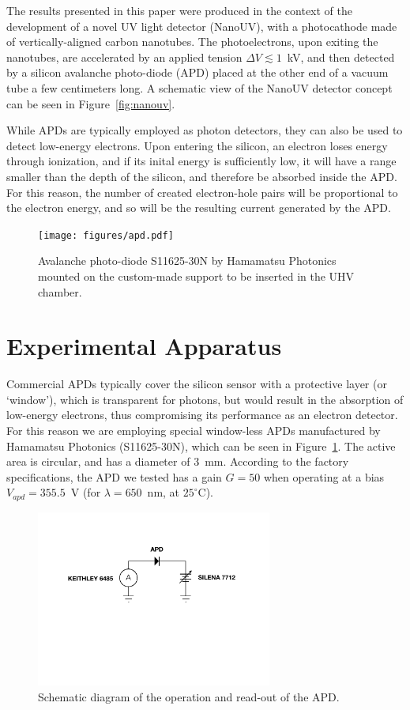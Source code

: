 \documentclass[12p]{paper}
\begin{document}
The results presented in this paper were produced in the context of the development of a novel UV light detector (NanoUV), with a photocathode made of vertically-aligned carbon nanotubes. The photoelectrons, upon exiting the nanotubes, are accelerated by an applied tension $\Delta V \lesssim 1$~kV, and then detected by a silicon avalanche photo-diode (APD) placed at the other end of a vacuum tube a few centimeters long. A schematic view of the NanoUV detector concept can be seen in Figure~\ref{fig:nanouv}. 

While APDs are typically employed as photon detectors, they can also be used to detect low-energy electrons. 
Upon entering the silicon, an electron loses energy through ionization, and if its inital energy is sufficiently low, it will have a range smaller than the depth of the silicon, and therefore be absorbed inside the APD. For this reason, the number of created electron-hole pairs will be proportional to the electron energy, and so will be the resulting current generated by the APD.

\begin{figure}[htb]
  \centering
  \texttt{[image: figures/apd.pdf]}
 \caption{Avalanche photo-diode S11625-30N by Hamamatsu Photonics mounted on the custom-made support to be inserted in the UHV chamber.
  \label{fig:apd}}
\end{figure}


\section{Experimental Apparatus}

Commercial APDs typically cover the silicon sensor with a protective layer (or `window'), which is transparent for photons, but would result in the absorption of low-energy electrons, thus compromising its performance as an electron detector. For this reason we are employing special window-less APDs manufactured by Hamamatsu Photonics (S11625-30N), which can be seen in Figure~\ref{fig:apd}. The active area is circular, and has a diameter of 3~mm. According to the factory specifications, the APD we tested has a gain $G = 50$ when operating at a bias $V_{apd} = 355.5$~V (for $\lambda = 650$~nm, at $25^{\circ}$C).


\begin{figure}[tb]
  \centering
\includegraphics[width=0.69\textwidth]{figures/circuit}
 \caption{Schematic diagram of the operation and read-out of the APD.
  \label{fig:schema}}
\end{figure}
\end{document}
